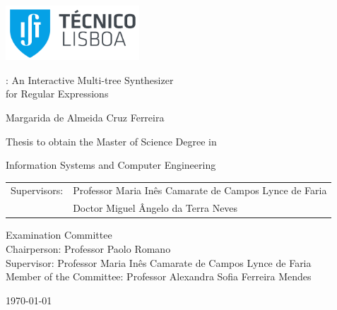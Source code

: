 \thispagestyle {empty}

\includegraphics[width=5cm]{pictures/IST_A.pdf}

\begin{center}

\vspace{2.5cm}
\vspace{1.0cm}
{\FontLb \Forest: An Interactive Multi-tree Synthesizer\\for Regular Expressions}


\vspace{2.7cm}
{\FontMb Margarida de Almeida Cruz Ferreira}

\vspace{2.0cm}
{\FontSn Thesis to obtain the Master of Science Degree in}

\vspace{0.3cm}
{\FontLb Information Systems and Computer Engineering}

\vspace{1.1cm}
{\FontSn %
	\begin{tabular}{rl}
Supervisors: & Professor Maria Inês Camarate de Campos Lynce de Faria \\
 & Doctor Miguel Ângelo da Terra Neves
\end{tabular}
}

\vspace{1.1cm}
{\FontMb Examination Committee} \\

\vspace{0.5cm}
{
\FontSn %
Chairperson: Professor Paolo Romano\\
Supervisor: Professor Maria Inês Camarate de Campos Lynce de Faria \\
Member of the Committee: Professor Alexandra Sofia Ferreira Mendes
}

\vspace{1.5cm}
{\FontMb \monthyeardate\today}

\end{center}

\cleardoublepage

